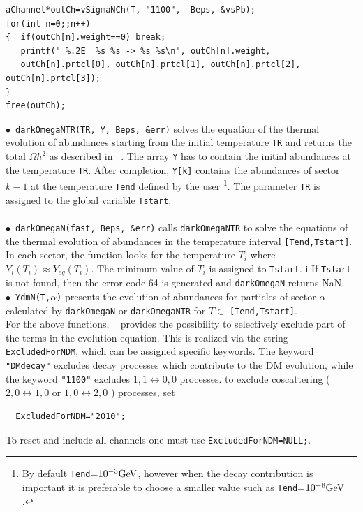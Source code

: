 \documentclass[12pt,a4paper]{article}
\begin{document}
\begin{verbatim}
aChannel*outCh=vSigmaNCh(T, "1100",  Beps, &vsPb);
for(int n=0;;n++)
{  if(outCh[n].weight==0) break;
   printf(" %.2E  %s %s -> %s %s\n", outCh[n].weight, 
   outCh[n].prtcl[0], outCh[n].prtcl[1], outCh[n].prtcl[2], outCh[n].prtcl[3]);
}
free(outCh);
\end{verbatim}
 
 \noindent
$\bullet$~\verb|darkOmegaNTR(TR, Y, Beps, &err)|  solves the equation of the thermal evolution of abundances
starting from the initial temperature {\tt TR} and returns the total $\Omega h^2$ as described in ~\cite{Alguero:2022inz}. The array {\tt Y} has to contain the initial abundances at the temperature
{\tt TR}. After completion, {\tt Y[k]} contains the abundances of sector $k-1$ at the temperature {\tt Tend} defined by the
user \footnote{By default {\tt Tend}=$10^{-3} {\rm GeV}$, however when the decay contribution is important it is preferable to choose a smaller value such as {\tt Tend}=$10^{-8} {\rm GeV}$ .}. The parameter {\tt TR} is assigned to the global variable {\tt Tstart}. \\
%
\\
$\bullet$~\verb|darkOmegaN(fast, Beps, &err)|  calls \verb|darkOmegaNTR| to solve the equations of the thermal evolution of abundances in the temperature interval \verb|[Tend,Tstart]|.
In each sector, the function looks for the temperature $T_i$ where $Y_i(T_i)\approx Y_{eq}(T_i)$. The minimum value of $T_i$ is assigned to {\tt Tstart}.  i If {\tt Tstart} is not found, then the 
error code 64 is generated and {\tt darkOmegaN} returns NaN. 
\\
$\bullet$~\verb|YdmN(T,|$\alpha${\tt)}  presents  the evolution of abundances  for particles of sector $\alpha$ calculated by
\verb|darkOmegaN| or \verb|darkOmegaNTR|  for  $ T \in $ {\tt [Tend,Tstart]}.\\

For the above functions, \micro~ provides the possibility to selectively exclude part of the terms in the evolution equation. 
This is realized via the string 
{\tt ExcludedForNDM}, which can be assigned specific keywords. The keyword \verb|"DMdecay"| excludes decay processes 
which contribute to the DM evolution, while the keyword  \verb|"1100"| excludes $1,1 \leftrightarrow 0,0$ processes. 
to exclude coscattering ($2,0 \leftrightarrow 1,0$ or $1,0 \leftrightarrow 2,0$ ) processes, set 
\begin{verbatim}
  ExcludedForNDM="2010";
\end{verbatim}
To reset and include all channels one must use    {\tt ExcludedForNDM=NULL;}. \\
                       
\end{document}
